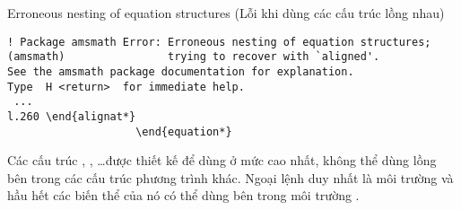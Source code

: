 
\begin{error}{Erroneous nesting of equation structures}
(Lỗi khi dùng các cấu trúc lồng nhau)
\errexa
\begin{verbatim}
! Package amsmath Error: Erroneous nesting of equation structures;
(amsmath)                trying to recover with `aligned'.
See the amsmath package documentation for explanation.
Type  H <return>  for immediate help.
 ...
l.260 \end{alignat*}
                    \end{equation*}
\end{verbatim}
\errexpl
Các cấu trúc , , \ldots được thiết kế để dùng
ở mức cao nhất, không thể dùng lồng bên trong các cấu trúc phương trình
khác. Ngoại lệnh duy nhất là môi trường  và hầu hết các biến
thể của nó có thể dùng bên trong môi trường .
\end{error}

